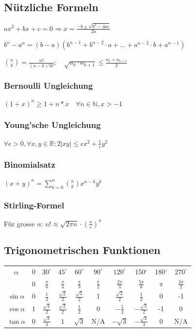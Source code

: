 \subsection{Nützliche Formeln}
$ax^2 + bx + c = 0 \Rightarrow x = \frac{-b \pm \sqrt{b^2 - 4ac}}{2a}$

$b^n- a^n = (b-a)(b^{n-1}+b^{n-2}\cdot a + \dots + a^{n-2}\cdot b + a^{n-1})$

$\binom{n}{k} = \frac{n!}{(n-k)!k!}; \quad \sqrt{a_k\cdot a_{k+1}} \leq \frac{a_k + a_{k+1}}{2}$

\subsubsection{Bernoulli Ungleichung}
$(1+x)^{n} \geq 1 + n*x \quad \forall n \in \mathbb{N}, x > -1$

\subsubsection{Young'sche Ungleichung}
$\forall \epsilon > 0, \forall x, y \in \mathbb{R}: 2 |xy| \leq \epsilon x^2 + \frac{1}{\epsilon} y^2$

\subsubsection{Binomialsatz}
$(x + y)^n = \sum_{k = 0}^n \binom{n}{k} x^{n-k}y^k$

\subsubsection{Stirling-Formel}
Für grosse $n$: $n! \approx \sqrt{2 \pi n} \cdot (\frac{n}{e})^n$

\subsection{Trigonometrischen Funktionen}

\bgroup
\def\arraystretch{1.8}
\begin{center}
\begin{tabular}{c|c|c|c|c|c|c|c|c|c}
     \(\alpha\)& 0& \(30^{\circ}\)& \(45^{\circ}\)& \(60^{\circ}\)& \(90^{\circ}\)& \(120^{\circ}\)& 150\(^{\circ}\)& 180\(^{\circ}\)
     & \(270^{\circ}\)\\
     \(\)& 0& \(\frac{\pi}{6}\)& \(\frac{\pi}{4}\)& \(\frac{\pi}{3}\)& \(\frac{\pi}{2}\)&\(\frac{2\pi}{3}\)& \(\frac{5\pi}{6}\)& \(\pi\) & \(\frac{3\pi}{2}\)\\
     \hline
     \(\sin{\alpha}\)& 0& \(\frac{1}{2}\)& \(\frac{\sqrt{2}}{2}\)& \(\frac{\sqrt{3}}{2}\)& 1& \(\frac{\sqrt{3}}{2}\)& \(\frac{1}{2}\)& 0
     & -1\\
     \hline
     \(\cos{\alpha}\)& 1& \(\frac{\sqrt{3}}{2}\)& \(\frac{\sqrt{2}}{2}\)& \(\frac{1}{2}\)& 0& \(-\frac{1}{2}\)& \(-\frac{\sqrt{3}}{2}\)& -1
     & 0\\
     \hline
     \(\tan{\alpha}\)& 0& \(\frac{\sqrt{3}}{3}\)& \(1\)& \(\sqrt{3}\)& N/A & \(-\sqrt{3}\)& \(-\frac{\sqrt{3}}{3}\)& 0
     & N/A \\
\end{tabular}
\end{center}


